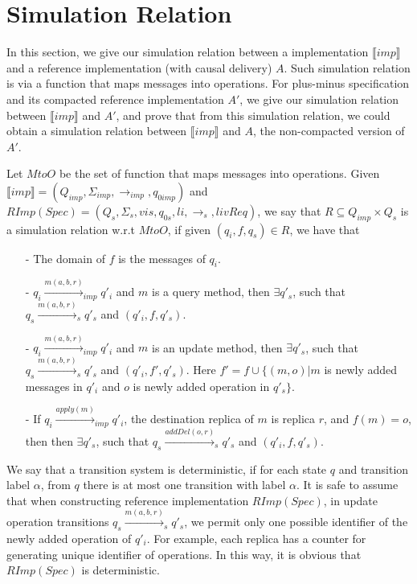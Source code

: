 
\section{Simulation Relation}
\label{sec:simulation relation}

In this section, we give our simulation relation between a implementation $\llbracket imp \rrbracket$ and a reference implementation (with causal delivery) $A$. Such simulation relation is via a function that maps messages into operations. For plus-minus specification and its compacted reference implementation $A'$, we give our simulation relation between $\llbracket imp \rrbracket$ and $A'$, and prove that from this simulation relation, we could obtain a simulation relation between $\llbracket imp \rrbracket$ and $A$, the non-compacted version of $A'$.

Let $MtoO$ be the set of function that maps messages into operations. Given $\llbracket imp \rrbracket = (Q_{imp},\Sigma_{imp},\rightarrow_{imp},q_{0imp})$ and $RImp(Spec) = (Q_s,\Sigma_s,vis,q_{0s},li,\rightarrow_s,livReq)$, we say that $R \subseteq Q_{imp} \times Q_s$ is a simulation relation w.r.t $MtoO$, if given $(q_i,f,q_s) \in R$, we have that

\begin{itemize}
\setlength{\itemsep}{0.5pt}
\item[-] The domain of $f$ is the messages of $q_i$. 

\item[-] $q_i {\xrightarrow{m(a,b,r)}}_{imp} q'_i$ and $m$ is a query method, then $\exists q'_s$, such that $q_s {\xrightarrow{m(a,b,r)}}_s q'_s$ and $(q'_i,f,q'_s)$.

\item[-] $q_i {\xrightarrow{m(a,b,r)}}_{imp} q'_i$ and $m$ is an update method, then $\exists q'_s$, such that $q_s {\xrightarrow{m(a,b,r)}}_s q'_s$ and $(q'_i,f',q'_s)$. Here $f' = f \cup \{ (m,o) \vert m$ is newly added messages in $q'_i$ and $o$ is newly added operation in $q'_s\}$.

\item[-] If $q_i {\xrightarrow{apply(m)}}_{imp} q'_i$, the destination replica of $m$ is replica $r$, and $f(m)=o$, then then $\exists q'_s$, such that $q_s {\xrightarrow{addDel(o,r)}}_s q'_s$ and $(q'_i,f,q'_s)$.
\end{itemize}

We say that a transition system is deterministic, if for each state $q$ and transition label $\alpha$, from $q$ there is at most one transition with label $\alpha$. {\color {red}It is safe to assume that when constructing reference implementation $RImp(Spec)$, in update operation transitions $q_s {\xrightarrow{m(a,b,r)}}_s q'_s$, we permit only one possible identifier of the newly added operation of $q'_i$. For example, each replica has a counter for generating unique identifier of operations. In this way, it is obvious that $RImp(Spec)$ is deterministic.}






